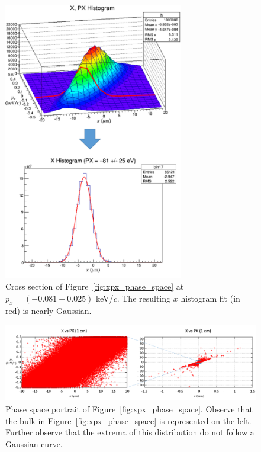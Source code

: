 \begin{figure}[H]
  \centering
    \includegraphics[width=0.7\textwidth]{Figures/xpx_phase_space_cut} 
  \caption[Cross section of Figure~\ref{fig:xpx_phase_space} at $p_x=0.08$ keV/$c$.]{Cross section of Figure~\ref{fig:xpx_phase_space} at $p_x=(-0.081 \pm 0.025)$ keV/$c$. The resulting $x$ histogram fit (in red) is nearly Gaussian.}
  \label{fig:xpx_phase_space_cut}
\end{figure}

\begin{figure}[H]
  \centering
    \includegraphics[width=\textwidth]{Figures/phase_space_portrait} 
  \caption[Phase space portrait of Figure~\ref{fig:xpx_phase_space}.]{Phase space portrait of Figure~\ref{fig:xpx_phase_space}. Observe that the bulk in Figure~\ref{fig:xpx_phase_space} is represented on the left. Further observe that the extrema of this distribution do not follow a Gaussian curve.}
  \label{fig:phase_space_portrait}
\end{figure}

